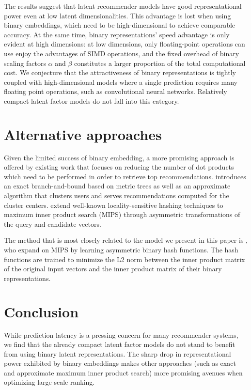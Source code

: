 \documentclass[sigchi]{acmart}
\begin{document}
The results suggest that latent recommender models have good representational power even at low latent dimensionalities. This advantage is lost when using binary embeddings, which need to be high-dimensional to achieve comparable accuracy. At the same time, binary representations' speed advantage is only evident at high dimensions: at low dimensions, only floating-point operations can use enjoy the advantages of SIMD operations, and the fixed overhead of binary scaling factors $\alpha$ and $\beta$ constitutes a larger proportion of the total computational cost. We conjecture that the attractiveness of binary representations is tightly coupled with high-dimensional models where a single prediction requires many floating point operations, such as convolutional neural networks. Relatively compact latent factor models do not fall into this category.

\section{Alternative approaches}
Given the limited success of binary embedding, a more promising approach is offered by existing work that focuses on reducing the number of dot products which need to be performed in order to retrieve top recommendations. \citet{koenigstein2012efficient} introduces an exact branch-and-bound based on metric trees as well as an approximate algorithm that clusters users and serves recommendations computed for the cluster centers. \citet{shrivastava2014asymmetric} extend well-known \citep{indyk1998approximate} locality-sensitive hashing techniques to maximum inner product search (MIPS) through asymmetric transformations of the query and candidate vectors.

The method that is most closely related to the model we present in this paper is \citet{Shen_2015_ICCV}, who expand on MIPS by learning asymmetric binary hash functions. The hash functions are trained to minimize the L2 norm between the inner product matrix of the original input vectors and the inner product matrix of their binary representations.

\section{Conclusion}
While prediction latency is a pressing concern for many recommender systems, we find that the already compact latent factor models do not stand to benefit from using binary latent representations. The sharp drop in representational power exhibited by binary embeddings makes other approaches (such as exact \citep{koenigstein2012efficient} and approximate \citep{shrivastava2014asymmetric} maximum inner product search) more promising avenues when optimizing large-scale ranking.




\end{document}
